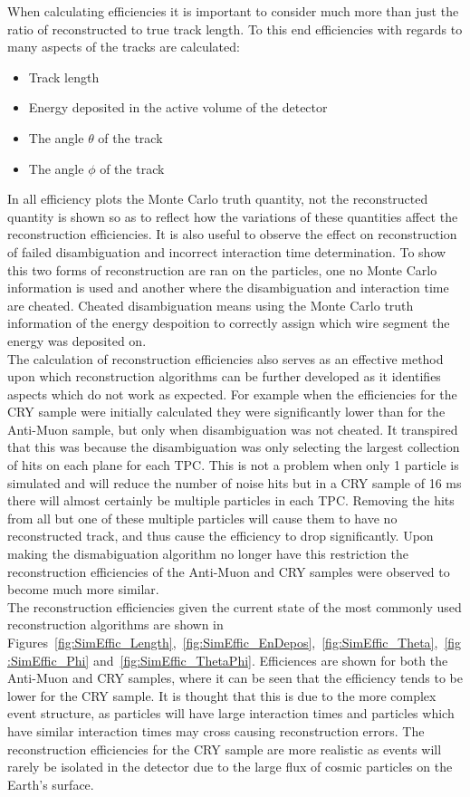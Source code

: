 When calculating efficiencies it is important to consider much more than just the ratio of reconstructed to true track length. To this end efficiencies with regards to many aspects of the tracks are calculated:
\begin{itemize}
\item Track length
\item Energy deposited in the active volume of the detector
\item The angle $\theta$ of the track
\item The angle $\phi$ of the track
\end{itemize}
In all efficiency plots the Monte Carlo truth quantity, not the reconstructed quantity is shown so as to reflect how the variations of these quantities affect the reconstruction efficiencies. It is also useful to observe the effect on reconstruction of failed disambiguation and incorrect interaction time determination. To show this two forms of reconstruction are ran on the particles, one no Monte Carlo information is used and another where the disambiguation and interaction time are cheated. Cheated disambiguation means using the Monte Carlo truth information of the energy despoition to correctly assign which wire segment the energy was deposited on. \\

The calculation of reconstruction efficiencies also serves as an effective method upon which reconstruction algorithms can be further developed as it identifies aspects which do not work as expected. For example when the efficiencies for the CRY sample were initially calculated they were significantly lower than for the Anti-Muon sample, but only when disambiguation was not cheated. It transpired that this was because the disambiguation was only selecting the largest collection of hits on each plane for each TPC. This is not a problem when only 1 particle is simulated and will reduce the number of noise hits but in a CRY sample of 16 ms there will almost certainly be multiple particles in each TPC. Removing the hits from all but one of these multiple particles will cause them to have no reconstructed track, and thus cause the efficiency to drop significantly. Upon making the dismabiguation algorithm no longer have this restriction the reconstruction efficiencies of the Anti-Muon and CRY samples were observed to become much more similar. \\

The reconstruction efficiencies given the current state of the most commonly used reconstruction algorithms are shown in Figures~\ref{fig:SimEffic_Length},~\ref{fig:SimEffic_EnDepos},~\ref{fig:SimEffic_Theta},~\ref{fig:SimEffic_Phi} and~\ref{fig:SimEffic_ThetaPhi}. Efficiences are shown for both the Anti-Muon and CRY samples, where it can be seen that the efficiency tends to be lower for the CRY sample. It is thought that this is due to the more complex event structure, as particles will have large interaction times and particles which have similar interaction times may cross causing reconstruction errors. The reconstruction efficiencies for the CRY sample are more realistic as events will rarely be isolated in the detector due to the large flux of cosmic particles on the Earth's surface. \\

